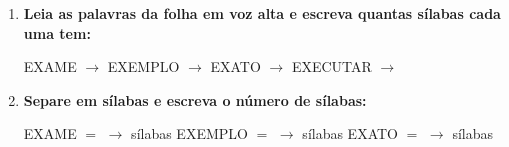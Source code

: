 \begin{exercicio}
\begin{enumerate}[resume]
  \item \textbf{Leia as palavras da folha em voz alta e escreva quantas sílabas cada uma tem:}

  \begin{center}
  EXAME $\rightarrow$ \underline{\hspace{1cm}} \quad EXEMPLO $\rightarrow$ \underline{\hspace{1cm}} \quad EXATO $\rightarrow$ \underline{\hspace{1cm}} \quad EXECUTAR $\rightarrow$ \underline{\hspace{1cm}}
  \end{center}

  \item \textbf{Separe em sílabas e escreva o número de sílabas:}
  \begin{center}
  EXAME $=$ \underline{\hspace{1.2cm}} $\rightarrow$ \underline{\hspace{0.8cm}} sílabas \quad EXEMPLO $=$ \underline{\hspace{1.2cm}} $\rightarrow$ \underline{\hspace{0.8cm}} sílabas \quad EXATO $=$ \underline{\hspace{1.2cm}} $\rightarrow$ \underline{\hspace{0.8cm}} sílabas
  \end{center}

\end{enumerate}

\end{exercicio}



